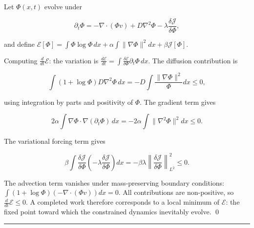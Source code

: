 \documentclass[11pt, twoside]{article}
\theoremstyle{plain}
\theoremstyle{definition}
\theoremstyle{remark}
\begin{document}
Let $\Phi(x,t)$ evolve under

\[
\partial_t \Phi = -\nabla \cdot (\Phi v) + D \nabla^2 \Phi - \lambda \frac{\delta \mathcal{J}}{\delta \Phi},
\]

and define $\mathcal{E}[\Phi] = \int \Phi \log \Phi \, dx + \alpha \int \|\nabla\Phi\|^2 dx + \beta \mathcal{J}[\Phi]$.

Computing $\frac{d}{dt}\mathcal{E}$: the variation is $\frac{d\mathcal{E}}{dt} = \int \frac{\delta\mathcal{E}}{\delta\Phi} \partial_t \Phi \, dx$. The diffusion contribution is

\[
\int (1 + \log\Phi) D\nabla^2\Phi \, dx = -D\int \frac{\|\nabla\Phi\|^2}{\Phi} dx \leq 0,
\]

using integration by parts and positivity of $\Phi$. The gradient term gives

\[
2\alpha \int \nabla\Phi \cdot \nabla(\partial_t\Phi) \, dx = -2\alpha \int \|\nabla^2\Phi\|^2 dx \leq 0.
\]

The variational forcing term gives

\[
\beta \int \frac{\delta\mathcal{J}}{\delta\Phi}\left(-\lambda\frac{\delta\mathcal{J}}{\delta\Phi}\right) dx = -\beta\lambda \left\|\frac{\delta\mathcal{J}}{\delta\Phi}\right\|^2_{L^2} \leq 0.
\]

The advection term vanishes under mass-preserving boundary conditions: $\int (1 + \log\Phi)(-\nabla \cdot (\Phi v)) dx = 0$. All contributions are non-positive, so $\frac{d}{dt}\mathcal{E} \leq 0$. A completed work therefore corresponds to a local minimum of $\mathcal{E}$: the fixed point toward which the constrained dynamics inevitably evolve. \qed


\newpage

\noindent\rule{\textwidth}{0.4pt}
\vspace{0.5em}
\end{document}
